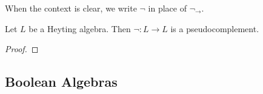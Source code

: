 \documentclass{book}
\begin{document}
	\begin{note}
		When the context is clear, we write $\neg$ in place of $\neg_{\rightarrow}$.
	\end{note}
	
	\begin{ex}
		Let $L$ be a Heyting algebra. Then $\neg: L \rightarrow L$ is a pseudocomplement.
	\end{ex}
	
	\begin{proof}
	\end{proof}
	
	
	
	
	
	
	
	
	
	
	
	
	
	
	
	
	
	
	
	
	
	
	
	
	
	
	
	
	
	
	
	
	
	
	
	
	
	
	
	
	
	
	
	
	
	
	
	
	
	
	
	
	
	
	
	
	
	
	
	
	
	
	
	
	
	
	
	
	
	
	
	
	
	
	
	
	\subsection{Boolean Algebras}
	
	
	
\end{document}
